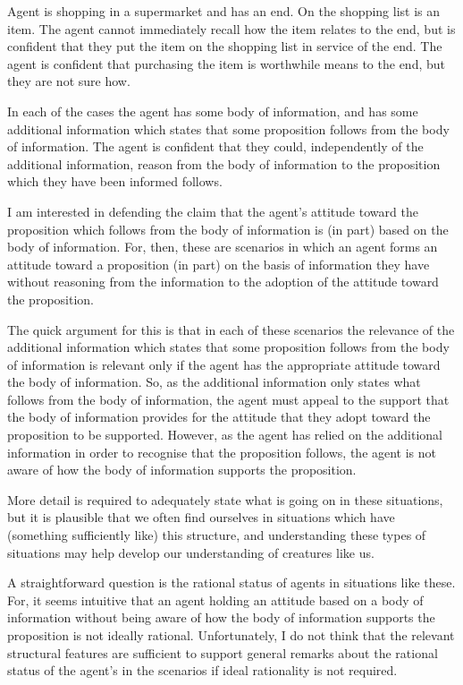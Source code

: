 \documentclass[10pt]{article}
\begin{document}
\begin{scenario}[Shopping]
  Agent is shopping in a supermarket and has an end.
  On the shopping list is an item.
  The agent cannot immediately recall how the item relates to the end, but is confident that they put the item on the shopping list in service of the end.
  The agent is confident that purchasing the item is worthwhile means to the end, but they are not sure how.
\end{scenario}

In each of the cases the agent has some body of information, and has some additional information which states that some proposition follows from the body of information.
The agent is confident that they could, independently of the additional information, reason from the body of information to the proposition which they have been informed follows.

I am interested in defending the claim that the agent's attitude toward the proposition which follows from the body of information is (in part) based on the body of information.
For, then, these are scenarios in which an agent forms an attitude toward a proposition (in part) on the basis of information they have without reasoning from the information to the adoption of the attitude toward the proposition.

The quick argument for this is that in each of these scenarios the relevance of the additional information which states that some proposition follows from the body of information is relevant only if the agent has the appropriate attitude toward the body of information.
So, as the additional information only states what follows from the body of information, the agent must appeal to the support that the body of information provides for the attitude that they adopt toward the proposition to be supported.
However, as the agent has relied on the additional information in order to recognise that the proposition follows, the agent is not aware of how the body of information supports the proposition.

More detail is required to adequately state what is going on in these situations, but it is plausible that we often find ourselves in situations which have (something sufficiently like) this structure, and understanding these types of situations may help develop our understanding of creatures like us.

A straightforward question is the rational status of agents in situations like these.
For, it seems intuitive that an agent holding an attitude based on a body of information without being aware of how the body of information supports the proposition is not ideally rational.
Unfortunately, I do not think that the relevant structural features are sufficient to support general remarks about the rational status of the agent's in the scenarios if ideal rationality is not required.
\end{document}
